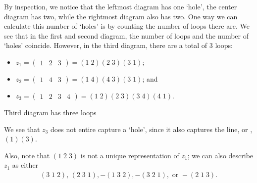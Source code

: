 \documentclass[notoc,notitlepage]{tufte-book}
\begin{document}
By inspection, we notice that the leftmost diagram has one `hole', the center
diagram has two, while the rightmost diagram also has two. One way we can
calculate this number of `holes' is by counting the number of loops there are.
We see that in the first and second diagram, the number of loops and the number
of `holes' coincide. However, in the third diagram, there are a total of 3
loops:
\begin{itemize}
  \item $z_1 = \begin{pmatrix} 1 & 2 & 3 \end{pmatrix} = (1 \; 2)(2 \; 3)(3 \;
    1)$;
  \item $z_2 = \begin{pmatrix} 1 & 4 & 3 \end{pmatrix} = (1 \; 4)(4 \; 3)(3 \;
    1)$; and
  \item $z_3 = \begin{pmatrix} 1 & 2 & 3 & 4 \end{pmatrix} = (1 \; 2)(2 \; 3)(3
    \; 4)(4 \; 1)$.
\end{itemize}
\begin{marginfigure}
  \centering
  \caption{Third diagram has three loops}\label{fig:third_diagram_has_three_loops}
\end{marginfigure}
We see that $z_3$ does not entire capture a `hole', since it also captures the
line, or , $(1) (3)$.

Also, note that $(1 \; 2 \; 3)$ is not a unique representation of $z_1$; we can
also describe $z_1$ as either
\begin{gather*}
  (3 \; 1 \; 2), \, (2 \; 3 \; 1), -(1 \; 3 \; 2), -(3 \; 2 \; 1), \text{ or }
  -(2 \; 1 \; 3).
\end{gather*}
\end{document}
